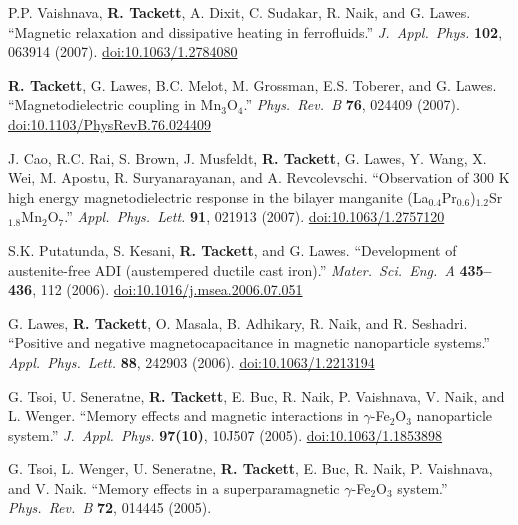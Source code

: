 \documentclass[10pt]{article}
\begin{document}
\begin{reflist}
\item P.P. Vaishnava, \textbf{R. Tackett}, A. Dixit, C. Sudakar, R. Naik, and G. Lawes. ``Magnetic relaxation and dissipative heating in ferrofluids.'' \textit{J.\ Appl.\ Phys.} \textbf{102}, 063914 (2007). \href{https://doi.org/10.1063/1.2784080}{\small\allowbreak doi:10.1063/1.2784080}
\item \textbf{R. Tackett}, G. Lawes, B.C. Melot, M. Grossman, E.S. Toberer, and G. Lawes. ``Magnetodielectric coupling in Mn$_3$O$_4$.'' \textit{Phys.\ Rev.\ B} \textbf{76}, 024409 (2007). \href{https://doi.org/10.1103/PhysRevB.76.024409}{\small\allowbreak doi:10.1103/PhysRevB.76.024409}
\item J. Cao, R.C. Rai, S. Brown, J. Musfeldt, \textbf{R. Tackett}, G. Lawes, Y. Wang, X. Wei, M. Apostu, R. Suryanarayanan, and A. Revcolevschi. ``Observation of 300 K high energy magnetodielectric response in the bilayer manganite (La$_{0.4}$Pr$_{0.6}$)$_{1.2}$Sr$_{1.8}$Mn$_2$O$_7$.'' \textit{Appl.\ Phys.\ Lett.} \textbf{91}, 021913 (2007). \href{https://doi.org/10.1063/1.2757120}{\small\allowbreak doi:10.1063/1.2757120}
\item S.K. Putatunda, S. Kesani, \textbf{R. Tackett}, and G. Lawes. ``Development of austenite-free ADI (austempered ductile cast iron).'' \textit{Mater.\ Sci.\ Eng.\ A} \textbf{435--436}, 112 (2006). \href{https://doi.org/10.1016/j.msea.2006.07.051}{\small\allowbreak doi:10.1016/j.msea.2006.07.051}
\item G. Lawes, \textbf{R. Tackett}, O. Masala, B. Adhikary, R. Naik, and R. Seshadri. ``Positive and negative magnetocapacitance in magnetic nanoparticle systems.'' \textit{Appl.\ Phys.\ Lett.} \textbf{88}, 242903 (2006). \href{https://doi.org/10.1063/1.2213194}{\small\allowbreak doi:10.1063/1.2213194}
\item G. Tsoi, U. Seneratne, \textbf{R. Tackett}, E. Buc, R. Naik, P. Vaishnava, V. Naik, and L. Wenger. ``Memory effects and magnetic interactions in $\gamma$-Fe$_2$O$_3$ nanoparticle system.'' \textit{J.\ Appl.\ Phys.} \textbf{97(10)}, 10J507 (2005). \href{https://doi.org/10.1063/1.1853898}{\small\allowbreak doi:10.1063/1.1853898}
\item G. Tsoi, L. Wenger, U. Seneratne, \textbf{R. Tackett}, E. Buc, R. Naik, P. Vaishnava, and V. Naik. ``Memory effects in a superparamagnetic $\gamma$-Fe$_2$O$_3$ system.'' \textit{Phys.\ Rev.\ B} \textbf{72}, 014445 (2005).
\end{reflist}

\end{document}
